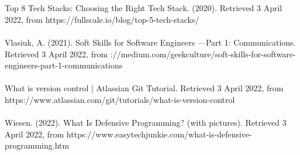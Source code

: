 \documentclass[a4paper, 11pt]{report}
\begin{document}
	\\
	\\
	Top 8 Tech Stacks: Choosing the Right Tech Stack. (2020). Retrieved 3 April 2022, from https://fullscale.io/blog/top-5-tech-stacks/
	\\
	\\
	Vlasiuk, A. (2021). Soft Skills for Software Engineers —Part 1: Communications. Retrieved 3 April 2022, from \https://medium.com/geekculture/soft-skills-for-software-engineers-part-1-communications
	\\
	\\
	What is version control | Atlassian Git Tutorial. Retrieved 3 April 2022, from \\https://www.atlassian.com/git/tutorials/what-is-version-control
	\\
	\\
	Wiesen. (2022). What Is Defensive Programming? (with pictures). Retrieved 3 April 2022, from https://www.easytechjunkie.com/what-is-defensive-programming.htm
	\\
	\\
	
\end{document}
